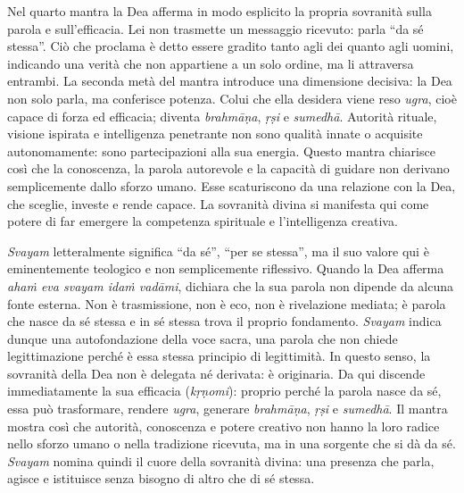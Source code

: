 Nel quarto mantra la Dea afferma in modo esplicito la propria sovranità sulla parola e sull’efficacia. Lei non trasmette un messaggio ricevuto: parla “da sé stessa”. Ciò che proclama è detto essere gradito tanto agli dei quanto agli uomini, indicando una verità che non appartiene a un solo ordine, ma li attraversa entrambi. La seconda metà del mantra introduce una dimensione decisiva: la Dea non solo parla, ma conferisce potenza. Colui che ella desidera viene reso \textit{ugra}, cioè capace di forza ed efficacia; diventa \textit{brahmāṇa}, \textit{ṛṣi} e \textit{sumedhā}. Autorità rituale, visione ispirata e intelligenza penetrante non sono qualità innate o acquisite autonomamente: sono partecipazioni alla sua energia. Questo mantra chiarisce così che la conoscenza, la parola autorevole e la capacità di guidare non derivano semplicemente dallo sforzo umano. Esse scaturiscono da una relazione con la Dea, che sceglie, investe e rende capace. La sovranità divina si manifesta qui come potere di far emergere la competenza spirituale e l’intelligenza creativa.

\textit{Svayam} letteralmente significa “da sé”, “per se stessa”, ma il suo valore qui è eminentemente teologico e non semplicemente riflessivo. Quando la Dea afferma \textit{ahaṁ eva svayam idaṁ vadāmi}, dichiara che la sua parola non dipende da alcuna fonte esterna. Non è trasmissione, non è eco, non è rivelazione mediata; è parola che nasce da sé stessa e in sé stessa trova il proprio fondamento. \textit{Svayam} indica dunque una autofondazione della voce sacra, una parola che non chiede legittimazione perché è essa stessa principio di legittimità. In questo senso, la sovranità della Dea non è delegata né derivata: è originaria. Da qui discende immediatamente la sua efficacia (\textit{kṛṇomi}): proprio perché la parola nasce da sé, essa può trasformare, rendere \textit{ugra}, generare \textit{brahmāṇa}, \textit{ṛṣi} e \textit{sumedhā}. Il mantra mostra così che autorità, conoscenza e potere creativo non hanno la loro radice nello sforzo umano o nella tradizione ricevuta, ma in una sorgente che si dà da sé. \textit{Svayam} nomina quindi il cuore della sovranità divina: una presenza che parla, agisce e istituisce senza bisogno di altro che di sé stessa.
